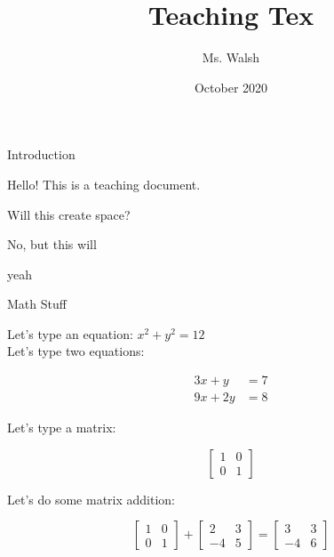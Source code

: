 \documentclass{beamer}
\title{Teaching Tex}
\author{Ms. Walsh}
\date{October 2020}
\begin{document}
\maketitle

\begin{frame}{Introduction}

\pause Hello! This is a teaching document.

\pause Will this create space?

No, \pause but this will\\

\vspace{.2in}

yeah

\end{frame}

\begin{frame}{Math Stuff}

Let's type an equation: $x^2 + y^2 = 12$\\

Let's type two equations:

\begin{align*}
3x + y &= 7\\
9x + 2y &= 8
\end{align*}

Let's type a matrix:

$$\begin{bmatrix}

1 & 0\\
0 & 1

\end{bmatrix}$$

Let's do some matrix addition:

$$\begin{bmatrix}
1 & 0\\
0 & 1
\end{bmatrix} +
\begin{bmatrix}
2 & 3\\
-4 & 5
\end{bmatrix} =
\begin{bmatrix}
3 & 3\\
-4 & 6
\end{bmatrix}$$

\end{frame}
\end{document}
